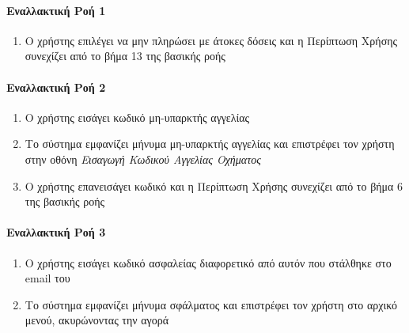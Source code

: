 \documentclass{../ol-softwaremanual}
\begin{document}
	\paragraph{Εναλλακτική Ροή 1}
	\begin{enumerate}
		\item Ο χρήστης επιλέγει να μην πληρώσει με άτοκες δόσεις και η Περίπτωση Χρήσης συνεχίζει από το βήμα 13 της βασικής ροής
	\end{enumerate}
	
	\paragraph{Εναλλακτική Ροή 2}
	\begin{enumerate}
		\item Ο χρήστης εισάγει κωδικό μη-υπαρκτής αγγελίας
		\item Το σύστημα εμφανίζει μήνυμα μη-υπαρκτής αγγελίας και επιστρέφει τον χρήστη στην οθόνη \textit{Εισαγωγή Κωδικού Αγγελίας Οχήματος} 
		\item Ο χρήστης επανεισάγει κωδικό και η Περίπτωση Χρήσης συνεχίζει από το βήμα 6 της βασικής ροής
	\end{enumerate}
	
	\paragraph{Εναλλακτική Ροή 3}
	\begin{enumerate}
			\item Ο χρήστης εισάγει κωδικό ασφαλείας διαφορετικό από αυτόν που στάλθηκε στο \en email \gr του
			\item Το σύστημα εμφανίζει μήνυμα σφάλματος και επιστρέφει τον χρήστη στο αρχικό μενού, ακυρώνοντας την αγορά
	\end{enumerate}
	
	
\end{document}
